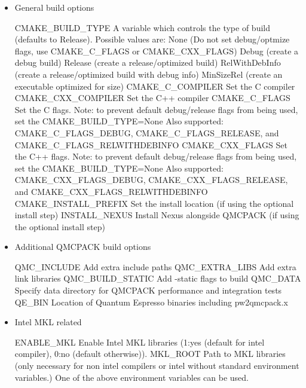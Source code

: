 \begin{itemize}
\item General build options
%
\begin{shade}
CMAKE_BUILD_TYPE     A variable which controls the type of build
                     (defaults to Release). Possible values are:
                     None (Do not set debug/optmize flags, use
                     CMAKE_C_FLAGS or CMAKE_CXX_FLAGS)
                     Debug (create a debug build)
                     Release (create a release/optimized build)
                     RelWithDebInfo (create a release/optimized build with debug info)
                     MinSizeRel (create an executable optimized for size)
CMAKE_C_COMPILER     Set the C compiler
CMAKE_CXX_COMPILER   Set the C++ compiler
CMAKE_C_FLAGS        Set the C flags.  Note: to prevent default
                     debug/release flags from being used, set the CMAKE_BUILD_TYPE=None
                     Also supported: CMAKE_C_FLAGS_DEBUG,
                     CMAKE_C_FLAGS_RELEASE, and CMAKE_C_FLAGS_RELWITHDEBINFO
CMAKE_CXX_FLAGS      Set the C++ flags.  Note: to prevent default
                     debug/release flags from being used, set the CMAKE_BUILD_TYPE=None
                     Also supported: CMAKE_CXX_FLAGS_DEBUG,
                     CMAKE_CXX_FLAGS_RELEASE, and CMAKE_CXX_FLAGS_RELWITHDEBINFO
CMAKE_INSTALL_PREFIX Set the install location (if using the optional install step)
INSTALL_NEXUS        Install Nexus alongside QMCPACK (if using the optional install step)
\end{shade}

\item Additional QMCPACK build options

\begin{shade}
QMC_INCLUDE         Add extra include paths
QMC_EXTRA_LIBS      Add extra link libraries
QMC_BUILD_STATIC    Add -static flags to build
QMC_DATA            Specify data directory for QMCPACK performance and integration tests
QE_BIN              Location of Quantum Espresso binaries including pw2qmcpack.x
\end{shade}

\item Intel MKL related
%
\begin{shade}
ENABLE_MKL          Enable Intel MKL libraries (1:yes (default for intel compiler),
                                                0:no (default otherwise)).
MKL_ROOT            Path to MKL libraries (only necessary for non intel compilers
                    or intel without standard environment variables.)
                    One of the above environment variables can be used.
\end{shade}


\end{itemize}
